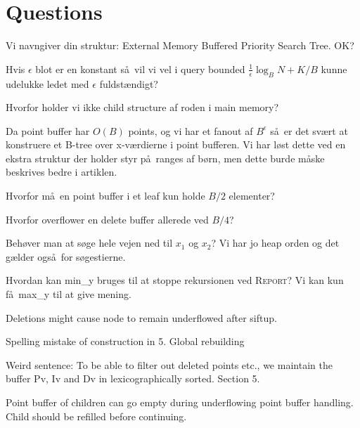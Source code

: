 \documentclass[a4paper,11pt,agenda,chair]{meetingmins}
\begin{document}
\maketitle

\section{Questions}
\begin{items}
\item Vi navngiver din struktur: External Memory Buffered Priority Search Tree. OK?

\item Hvis $\epsilon$ blot er en konstant s\aa ~vil vi vel i query bounded $\frac{1}{\epsilon} \log_B N + K/B$ kunne udelukke ledet med $\epsilon$ fuldst\ae ndigt?

\item Hvorfor holder vi ikke child structure af roden i main memory?

\item Da point buffer har $O(B)$ points, og vi har et fanout af $B^\epsilon$ s\aa ~er det sv\ae rt at konstruere et B-tree over x-v\ae rdierne i point bufferen. Vi har l\o st dette ved en ekstra struktur der holder styr p\aa ~ranges af b\o rn, men dette burde m\aa ske beskrives bedre i artiklen.

\item Hvorfor m\aa ~en point buffer i et leaf kun holde $B/2$ elementer?

\item Hvorfor overflower en delete buffer allerede ved $B/4$?

\item Beh\o ver man at s\o ge hele vejen ned til $x_1$ og $x_2$? Vi har jo heap orden og det g\ae lder ogs\aa ~for s\o gestierne.

\item Hvordan kan min\_y bruges til at stoppe rekursionen ved \textsc{Report}? Vi kan kun f\aa~max\_y til at give mening.

\item Deletions might cause node to remain underflowed after siftup.

\item Spelling mistake of construction in 5. Global rebuilding

\item Weird sentence: To be able to filter out deleted points etc., we maintain the buffer Pv, Iv and Dv in lexicographically sorted. Section 5.

\item Point buffer of children can go empty during underflowing point buffer handling. Child should be refilled before continuing.

\end{items}
\end{document}
